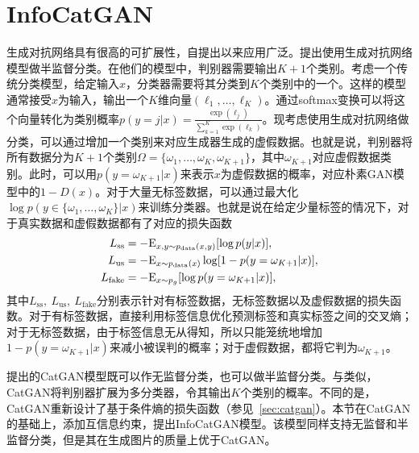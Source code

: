 \section{InfoCatGAN}\label{sec:icg}
生成对抗网络具有很高的可扩展性，自提出以来应用广泛。\citet{salimans2016improved,odena2016semi}提出使用生成对抗网络模型做半监督分类。在他们的模型中，判别器需要输出$K+1$个类别。考虑一个传统分类模型，给定输入$x$，分类器需要将其分类到$K$个类别中的一个。这样的模型通常接受$x$为输入，输出一个$K$维向量$(\ell_1, \dots, \ell_K)$。通过softmax变换可以将这个向量转化为类别概率$p(y=j|x) = \frac{\exp(\ell_j)}{\sum_{k=1}^K \exp(\ell_k)}$。现考虑使用生成对抗网络做分类，可以通过增加一个类别来对应生成器生成的虚假数据。也就是说，判别器将所有数据分为$K+1$个类别$\Omega = \{\omega_1, \dots, \omega_K, \omega_{K+1}\}$，其中$\omega_{K+1}$对应虚假数据类别。此时，可以用$p(y=\omega_{K+1}|x)$来表示$x$为虚假数据的概率，对应朴素GAN模型中的$1 - D(x)$。对于大量无标签数据，可以通过最大化$\log p(y\in \{\omega_1,\dots,\omega_K\} | x)$来训练分类器。也就是说在给定少量标签的情况下，对于真实数据和虚假数据都有了对应的损失函数
\begin{align}
  L_{\text{ss}} &= -\text{E}_{x,y \sim p_{\text{data}}(x,y)}[\log p(y|x)], \\
  L_{\text{us}} &= -\text{E}_{x\sim p_{\text{data}}(x)}\log [1 - p(y=\omega_{K+1} | x)], \\
  L_{\text{fake}} &= -\text{E}_{x\sim p_g}[\log p(y=\omega_{K+1} | x)],
\end{align}
其中$L_{\text{ss}}, ~L_{\text{us}}, ~L_{\text{fake}}$分别表示针对有标签数据，无标签数据以及虚假数据的损失函数。对于有标签数据，直接利用标签信息优化预测标签和真实标签之间的交叉熵；对于无标签数据，由于标签信息无从得知，所以只能笼统地增加$1-p(y=\omega_{K+1}|x)$来减小被误判的概率；对于虚假数据，都将它判为$\omega_{K+1}$。

\citet{springenberg2015unsupervised}提出的CatGAN模型既可以作无监督分类，也可以做半监督分类。与\citet{salimans2016improved,odena2016semi}类似，CatGAN将判别器扩展为多分类器，令其输出$K$个类别的概率。不同的是，CatGAN重新设计了基于条件熵的损失函数（参见~\ref{sec:catgan}）。本节在CatGAN的基础上，添加互信息约束，提出InfoCatGAN模型。该模型同样支持无监督和半监督分类，但是其在生成图片的质量上优于CatGAN。



